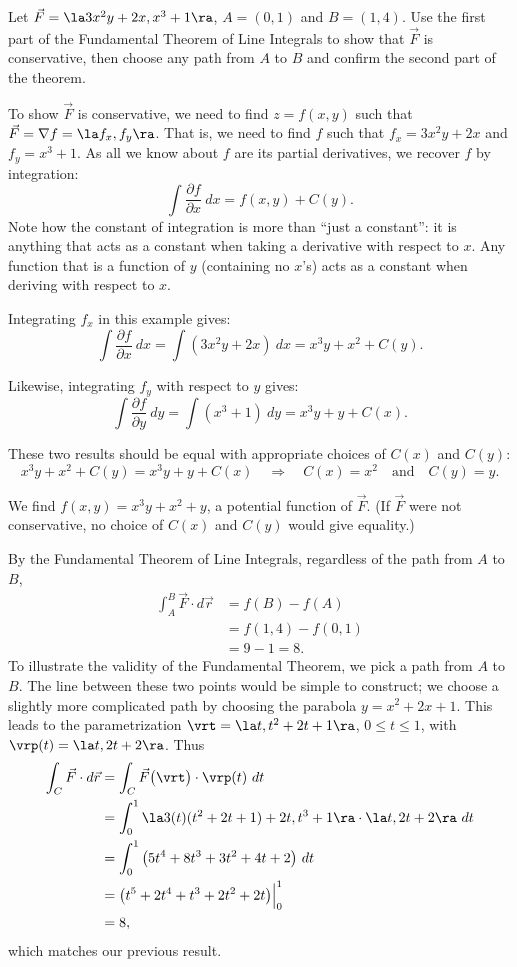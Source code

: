 {Let $\vec F = \la 3x^2y+2x, x^3+1\ra$, $A = (0,1)$ and $B = (1,4)$. Use the first part of the Fundamental Theorem of Line Integrals to show that $\vec F$ is conservative, then choose any path from $A$ to $B$ and confirm the second part of the theorem.
}
{To show $\vec F$ is conservative, we need to find $z = f(x,y)$ such that $\vec F = \nabla f = \la f_x, f_y\ra$. That is, we need to find $f$ such that $f_x = 3x^2y+2x$ and $f_y = x^3+1$. As all we know about $f$ are its partial derivatives, we recover $f$ by integration:
$$\int \frac{\partial f}{\partial x}\ dx = f(x,y) + C(y).$$
Note how the constant of integration is more than ``just a constant'': it is anything that acts as a constant when taking a derivative with respect to $x$. Any function that is a function of $y$ (containing no $x$'s) acts as a constant when deriving with respect to $x$.

Integrating $f_x$ in this example gives:
$$\int \frac{\partial f}{\partial x}\ dx = \int (3x^2y+2x)\ dx = x^3y+x^2 + C(y).$$

Likewise, integrating $f_y$ with respect to $y$ gives:
$$\int \frac{\partial f}{\partial y}\ dy = \int( x^3+1)\ dy = x^3y+ y + C(x).$$

These two results should be equal with appropriate choices of $C(x)$ and $C(y)$:
$$x^3y+x^2 + C(y) = x^3y+ y + C(x)\quad \Rightarrow\quad C(x) = x^2 \quad \text{and}\quad C(y) = y.$$

We find $f(x,y) = x^3y+x^2+y$, a potential function of $\vec F$. (If $\vec F$ were not conservative, no choice of $C(x)$ and $C(y)$ would give equality.)

By the Fundamental Theorem of Line Integrals, regardless of the path from $A$ to $B$, 
\begin{align*}
\int_A^B\vec F\cdot d\vec r &= f(B) - f(A) \\
			&= f(1,4) - f(0,1) \\
			&= 9 - 1 = 8.
\end{align*}
To illustrate the validity of the Fundamental Theorem, we pick a path from $A$ to $B$. The line between these two points would be simple to construct; we choose a slightly more complicated path by choosing the parabola $y = x^2+2x+1$. This leads to the parametrization $\vrt = \la t, t^2+2t+1\ra$, $0\leq t\leq 1$, with $\vrp(t) = \la t, 2t+2\ra$. Thus
\begin{align*}
\int_C \vec F\cdot d\vec r &= \int_C\vec F\big(\vrt\big)\cdot\vrp(t)\ dt\\
				&= \int_0^1\la 3(t)(t^2+2t+1)+2t, t^3+1\ra\cdot\la t,2t+2\ra\ dt\\
				&= \int_0^1 \big(5t^4+8t^3+3t^2+4t+2\big)\ dt\\
				&= \big(t^5+2t^4+t^3+2t^2+2t\big)\Big|_0^1\\
				&= 8,
\end{align*}				
which matches our previous result.
}\\

